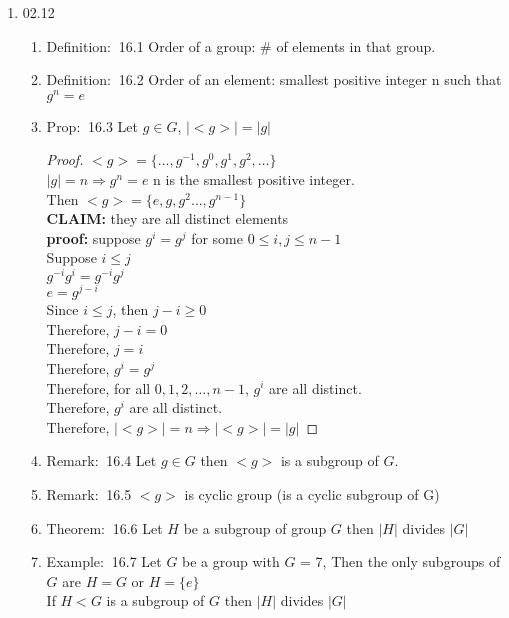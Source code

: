\documentclass[12pt]{article}
\newcommand{\theo}{{\color{blue} Theorem: $\ $}}
\newcommand{\defi}{{\color{blue} Definition: $\ $}}
\newcommand{\exe}{{\color{green} Example: $\ $}}
\newcommand{\prop}{{\color{blue} Prop: $\ $}}
\newcommand{\rem}{{\color{blue} Remark: $\ $}}
\begin{document}
\begin{enumerate}
    \item 02.12
    \begin{enumerate}
        \item \defi 16.1 Order of a group: \# of elements in that group.
        \item \defi 16.2 Order of an element: smallest positive integer n such that $g^n = e$
        \item \prop 16.3 Let $g \in G$, $|<g>| = |g|$\\
        \begin{proof}
            $<g> = \{\dots, g^{-1}, g^0, g^1, g^2, \dots\}$\\
            $|g| = n \Rightarrow g^n = e$ n is the smallest positive integer.\\
            Then $<g> = \{e, g, g^2 \dots, g^{n-1}\}$\\
            \textbf{CLAIM:} they are all distinct elements\\
            \textbf{proof:} 
            suppose $g^i = g^j$ for some $0 \le i,j \le n-1$\\
            Suppose $i \le j$\\
            $g^{-i} g^i = g^{-i}g^j$\\
            $e = g^{j-i}$\\
            Since $i \le j$, then $j-i \ge 0$\\
            Therefore, $j - i = 0$\\
            Therefore, $j = i$\\
            Therefore, $g^i = g^j$\\
            Therefore, for all $0,1,2,\dots,n-1$, $g^i$ are all distinct.\\
            Therefore, $g^i$ are all distinct.\\
            Therefore, $|<g>| = n \Rightarrow |<g>| = |g|$ 
        \end{proof}
        \item \rem 16.4 Let $g\in G$ then $<g>$ is a subgroup of $G$.
        \item \rem 16.5 $<g>$ is cyclic group (is a cyclic subgroup of G)
        \item \theo 16.6 Let $H$ be a subgroup of group $G$ then $|H|$ divides $|G|$
        \item \exe 16.7 Let $G$ be a group with $G$ = 7, Then the only subgroups of $G$ are $H = G$ or $H = \{e\}$\\
        If $H < G$ is a subgroup of $G$ then $|H|$ divides $|G|$\\

\end{enumerate}
\end{enumerate}
\end{document}

